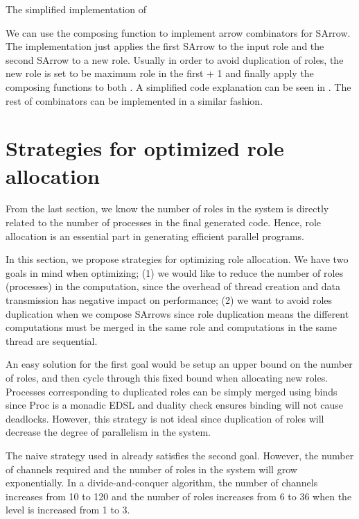 \begin{listing}
\inputminted{Haskell}{arrow/impl.hs}
\caption{The simplified implementation of \hask{>>>}}
\label{SArrow:code:impl}
\end{listing}

We can use the  composing function to implement arrow combinators for SArrow. The implementation just applies the first SArrow to the input role and the second SArrow to a new role. Usually in order to avoid duplication of roles, the new role is set to be maximum role in the first  + 1 and finally apply the  composing functions to both . A simplified code explanation can be seen in . The rest of combinators can be implemented in a similar fashion.

\section{Strategies for optimized role allocation} \label{SArrow:roleAllc}
From the last section, we know the number of roles in the system is directly related to the number of processes in the final generated code. Hence, role allocation is an essential part in generating efficient parallel programs. 

In this section, we propose strategies for optimizing role allocation. We have two goals in mind when optimizing; (1) we would like to reduce the number of roles (processes) in the computation, since the overhead of thread creation and data transmission has negative impact on performance; (2) we want to avoid roles duplication when we compose SArrows since role duplication means the different computations must be merged in the same role and computations in the same thread are sequential.

An easy solution for the first goal would be setup an upper bound on the number of roles, and then cycle through this fixed bound when allocating new roles. Processes corresponding to duplicated roles can be simply merged using binds since Proc is a monadic EDSL and duality check ensures binding will not cause deadlocks. However, this strategy is not ideal since duplication of roles will decrease the degree of parallelism in the system.

The naive strategy used in  already satisfies the second goal. However, the number of channels required and the number of roles in the system will grow exponentially. In a divide-and-conquer algorithm, the number of channels increases from 10 to 120 and the number of roles increases from 6 to 36 when the level is increased from 1 to 3.


